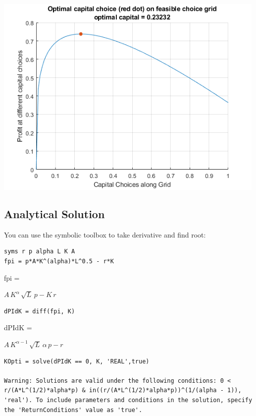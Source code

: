 \documentclass[
]{book}
\begin{document}
\includegraphics[width=5.20833in,height=\textheight]{img/K_borrow_firm_images/figure_0.png}

\hypertarget{analytical-solution-1}{%
\subsection{Analytical Solution}\label{analytical-solution-1}}

You can use the symbolic toolbox to take derivative and find root:

\begin{verbatim}
syms r p alpha L K A
fpi = p*A*K^(alpha)*L^0.5 - r*K
\end{verbatim}

fpi =

\(\displaystyle A\,K^{\alpha } \,\sqrt{L}\,p-K\,r\)

\begin{verbatim}
dPIdK = diff(fpi, K)
\end{verbatim}

dPIdK =

\(\displaystyle A\,K^{\alpha -1} \,\sqrt{L}\,\alpha \,p-r\)

\begin{verbatim}
KOpti = solve(dPIdK == 0, K, 'REAL',true)

Warning: Solutions are valid under the following conditions: 0 < r/(A*L^(1/2)*alpha*p) & in((r/(A*L^(1/2)*alpha*p))^(1/(alpha - 1)), 'real'). To include parameters and conditions in the solution, specify the 'ReturnConditions' value as 'true'.
\end{verbatim}
\end{document}
